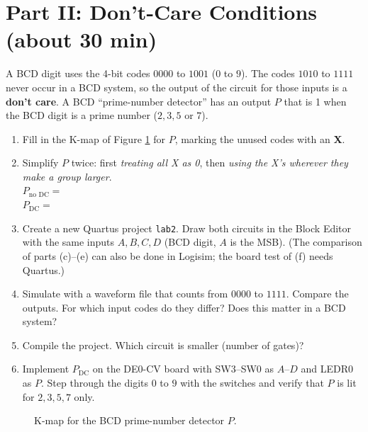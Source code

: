\documentclass{article}
\begin{document}
\section*{Part II: Don't-Care Conditions (about 30 min)}

A BCD digit uses the 4-bit codes $0000$ to $1001$ ($0$ to $9$). The codes $1010$ to $1111$ never occur in a BCD system, so the output of the circuit for those inputs is a \textbf{don't care}. A BCD ``prime-number detector'' has an output $P$ that is 1 when the BCD digit is a prime number ($2, 3, 5$ or $7$).

\begin{enumerate}
    \item[(a)] Fill in the K-map of Figure \ref{fig:kmap2} for $P$, marking the unused codes with an \textbf{X}.
    \item[(b)] Simplify $P$ twice: first \emph{treating all X as 0}, then \emph{using the X's wherever they make a group larger}. \\[0.2cm]
    $P_{\text{no DC}} = $ \underline{\hspace{6cm}} \\[0.2cm]
    $P_{\text{DC}} = $ \underline{\hspace{6cm}}
    \item[(c)] Create a new Quartus project \texttt{lab2}. Draw both circuits in the Block Editor with the same inputs $A, B, C, D$ (BCD digit, $A$ is the MSB). (The comparison of parts (c)--(e) can also be done in Logisim; the board test of (f) needs Quartus.)
    \item[(d)] Simulate with a waveform file that counts from $0000$ to $1111$. Compare the outputs. For which input codes do they differ? Does this matter in a BCD system?
    \item[(e)] Compile the project. Which circuit is smaller (number of gates)? \underline{\hspace{4cm}}
    \item[(f)] Implement $P_{\text{DC}}$ on the DE0-CV board with SW3--SW0 as $A$--$D$ and LEDR0 as $P$. Step through the digits $0$ to $9$ with the switches and verify that $P$ is lit for $2, 3, 5, 7$ only.
\end{enumerate}

\begin{figure}[H]
    \centering
    \caption{K-map for the BCD prime-number detector $P$.}
    \label{fig:kmap2}
\end{figure}
\end{document}
